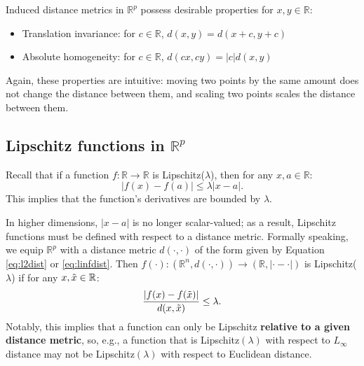 \documentclass{article}
\newcommand{\R}{\mathbb{R}}
\newcommand{\Rp}{\mathbb{R}^p}
\begin{document}
Induced distance metrics in $\Rp$ possess desirable properties for $x,y \in \R$:
\begin{itemize}
    \item Translation invariance: for $c \in \R$, $d(x,y) = d(x+c, y+c)$
    \item Absolute homogeneity: for $c \in \R$, $d(cx, cy) = |c| d(x,y)$
\end{itemize}
Again, these properties are intuitive: moving two points by the same amount does not change the distance between them, and scaling two points scales the distance between them.

\subsection{Lipschitz functions in $\Rp$}
\label{app:lipschitz}

Recall that if a function $f: \R \to \R$ is Lipschitz($\lambda$), then for any $x, a \in \R$:
\begin{equation*}
    |f(x) - f(a)| \leq \lambda |x-a|.
\end{equation*}
This implies that the function's derivatives are bounded by $\lambda$.

In higher dimensions, $|x-a|$ is no longer scalar-valued;
as a result, Lipschitz functions must be defined with respect to a distance metric.
Formally speaking, we equip $\Rp$ with a distance metric $d(\cdot, \cdot)$ of the form given by Equation \ref{eq:l2dist} or \ref{eq:linfdist}.
Then $f(\cdot): (\R^n, d(\cdot, \cdot)) \to (\R, |\cdot - \cdot|)$ is Lipschitz($\lambda$) if for any $x, \Tilde{x} \in \R$:
\begin{equation*}
    \frac{|f(x) - f(\Tilde{x})|}{d(x, \Tilde{x})} \leq \lambda.
\end{equation*}
Notably, this implies that a function can only be Lipschitz \textbf{relative to a given distance metric},
so, e.g., a function that is Lipschitz$(\lambda)$ with respect to $L_\infty$ distance may not be Lipschitz$(\lambda)$ with respect to Euclidean distance.
\end{document}
